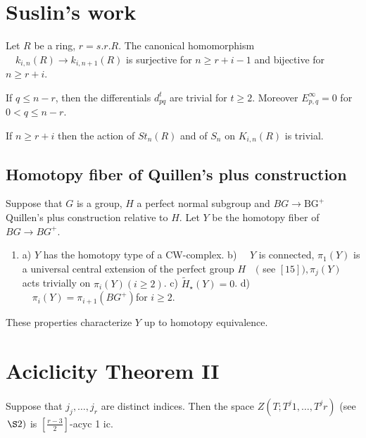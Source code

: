 \section{Suslin's work}
\cite{suslinStabilityAlgebraicKtheory1982} 

\begin{theo}
    Let $R$ be a ring, $r=s . r . R$. The canonical homomorphism $\quad k_{i, n}(R) \rightarrow k_{i, n+1}(R)$ is surjective for $n \geq r+i-1$ and bijective for $n \geq r+i$.    
    \end{theo}

 \begin{prop}
If $q \leq n-r$, then the differentials $d_{p q}^t$ are trivial for $t \geq 2$. Moreover $E_{p, q}^{\infty}=0$ for $0<q \leq n-r$.
 \end{prop}   

 \begin{coro}
    If $n \geq r+i$ then the action of $S t_n(R)$ and of $S_n$ on $K_{i, n}(R)$ is trivial.
 \end{coro}

\subsection{Homotopy fiber of Quillen's plus construction}

Suppose that $G$ is a group, $H$ a perfect normal subgroup and $B G \rightarrow \mathrm{BG}^{+}$Quillen's plus construction relative to $H$. Let $Y$ be the homotopy fiber of $B G \rightarrow B G^{+}$.

\begin{lemm}
    \begin{enumerate}
        \item a) $Y$ has the homotopy type of a CW-complex.
        b) $\quad Y$ is connected, $\pi_1(Y)$ is a universal central extension of the perfect group $H \quad($ see $[15]), \pi_j(Y)$ acts trivially on $\pi_i(Y)(i \geq 2)$.
        c) $\tilde{H}_{\star}(Y)=0$.
        d) $\quad \pi_i(Y)=\pi_{i+1}\left(B G^{+}\right)$for $i \geq 2$.
    \end{enumerate}
    These properties characterize $Y$ up to homotopy equivalence.
\end{lemm}

\section{Aciclicity Theorem II}

\begin{theo}
Suppose that $j_j, \ldots, j_r$ are distinct indices. Then the space $Z\left(T ; T^j 1, \ldots, T^j r\right)$ (see $\left.\S 2\right)$ is $\left[\frac{r-3}{2}\right]$-acyc 1 ic.    
\end{theo}


